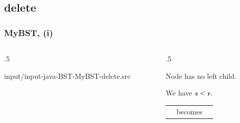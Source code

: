 \documentclass[10pt]{beamer}
\begin{document}
\subsection{delete}
\begin{frame}[t]\frametitle{MyBST,  (i)}
	\vspace{-0.3cm}
	\begin{columns}[T] %
	\begin{column}{.5\linewidth} %
		{\tiny 
			
				{input/input-java-BST-MyBST-delete.src}
		} %
\	\end{column} %
	\begin{column}{.5\linewidth} %
		{\tiny 
		\begin{example}
		Node  has no left child.
		
		We have $ \hCode{z} < \hCode{r}.$
		\begin{center}
			\begin{tabular}{c c c}
				\adjustbox{valign=t}{			
					
				} %
				& becomes
				&
				\adjustbox{valign=t}{	
					
				} %
			\end{tabular}
		\end{center}
		\end{example}
		} %
	\end{column} %
	\end{columns} %

\end{frame}
\end{document}
